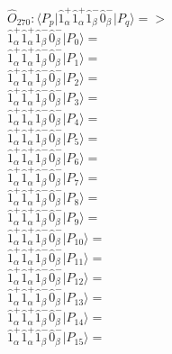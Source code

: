 \documentclass[14pt]{article}
\begin{document}
    $\hat{O}_{270}:  \langle{P_p}\vert \hat{1}_{\alpha}^{+}\hat{1}_{\alpha}^{+}\hat{1}_{\beta}^{-}\hat{0}_{\beta}^{-} \vert{P_q}\rangle => $ \\ 
    $ \hat{1}_{\alpha}^{+}\hat{1}_{\alpha}^{+}\hat{1}_{\beta}^{-}\hat{0}_{\beta}^{-} \vert{P_{0}}\rangle =  $ \\ 
    $ \hat{1}_{\alpha}^{+}\hat{1}_{\alpha}^{+}\hat{1}_{\beta}^{-}\hat{0}_{\beta}^{-} \vert{P_{1}}\rangle =  $ \\ 
    $ \hat{1}_{\alpha}^{+}\hat{1}_{\alpha}^{+}\hat{1}_{\beta}^{-}\hat{0}_{\beta}^{-} \vert{P_{2}}\rangle =  $ \\ 
    $ \hat{1}_{\alpha}^{+}\hat{1}_{\alpha}^{+}\hat{1}_{\beta}^{-}\hat{0}_{\beta}^{-} \vert{P_{3}}\rangle =  $ \\ 
    $ \hat{1}_{\alpha}^{+}\hat{1}_{\alpha}^{+}\hat{1}_{\beta}^{-}\hat{0}_{\beta}^{-} \vert{P_{4}}\rangle =  $ \\ 
    $ \hat{1}_{\alpha}^{+}\hat{1}_{\alpha}^{+}\hat{1}_{\beta}^{-}\hat{0}_{\beta}^{-} \vert{P_{5}}\rangle =  $ \\ 
    $ \hat{1}_{\alpha}^{+}\hat{1}_{\alpha}^{+}\hat{1}_{\beta}^{-}\hat{0}_{\beta}^{-} \vert{P_{6}}\rangle =  $ \\ 
    $ \hat{1}_{\alpha}^{+}\hat{1}_{\alpha}^{+}\hat{1}_{\beta}^{-}\hat{0}_{\beta}^{-} \vert{P_{7}}\rangle =  $ \\ 
    $ \hat{1}_{\alpha}^{+}\hat{1}_{\alpha}^{+}\hat{1}_{\beta}^{-}\hat{0}_{\beta}^{-} \vert{P_{8}}\rangle =  $ \\ 
    $ \hat{1}_{\alpha}^{+}\hat{1}_{\alpha}^{+}\hat{1}_{\beta}^{-}\hat{0}_{\beta}^{-} \vert{P_{9}}\rangle =  $ \\ 
    $ \hat{1}_{\alpha}^{+}\hat{1}_{\alpha}^{+}\hat{1}_{\beta}^{-}\hat{0}_{\beta}^{-} \vert{P_{10}}\rangle =  $ \\ 
    $ \hat{1}_{\alpha}^{+}\hat{1}_{\alpha}^{+}\hat{1}_{\beta}^{-}\hat{0}_{\beta}^{-} \vert{P_{11}}\rangle =  $ \\ 
    $ \hat{1}_{\alpha}^{+}\hat{1}_{\alpha}^{+}\hat{1}_{\beta}^{-}\hat{0}_{\beta}^{-} \vert{P_{12}}\rangle =  $ \\ 
    $ \hat{1}_{\alpha}^{+}\hat{1}_{\alpha}^{+}\hat{1}_{\beta}^{-}\hat{0}_{\beta}^{-} \vert{P_{13}}\rangle =  $ \\ 
    $ \hat{1}_{\alpha}^{+}\hat{1}_{\alpha}^{+}\hat{1}_{\beta}^{-}\hat{0}_{\beta}^{-} \vert{P_{14}}\rangle =  $ \\ 
    $ \hat{1}_{\alpha}^{+}\hat{1}_{\alpha}^{+}\hat{1}_{\beta}^{-}\hat{0}_{\beta}^{-} \vert{P_{15}}\rangle =  $ \\ 
    
\end{document}
